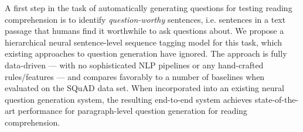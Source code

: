 A first step in the task of automatically generating questions for testing reading comprehension is to identify \emph{question-worthy} sentences, i.e. sentences in a text passage that humans find it worthwhile to ask questions about. We propose a hierarchical neural sentence-level sequence tagging model for this task, which existing approaches to question generation have ignored. The approach is fully data-driven — with no sophisticated NLP pipelines or any hand-crafted rules/features — and compares favorably to a number of baselines when evaluated on the SQuAD data set. When incorporated into an existing neural question generation system, the resulting end-to-end system achieves state-of-the-art performance for paragraph-level question generation for reading comprehension.
